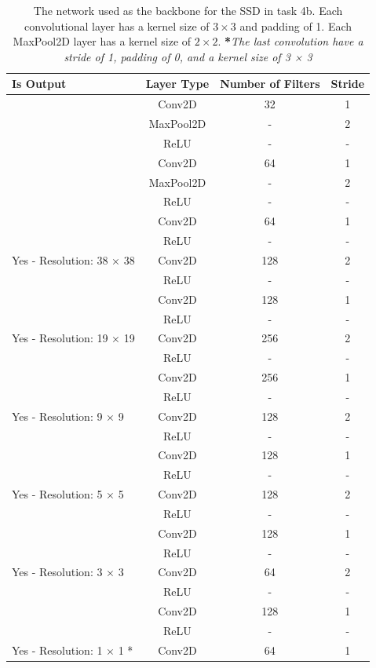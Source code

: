 \documentclass{article}
\begin{document}
\begin{table}[H]
\caption{The network used as the backbone for the SSD in task 4b. Each convolutional layer has a kernel size of $3 \times 3$ and padding of
1. Each MaxPool2D layer has a kernel size of $2 \times 2$. \textbf{*}\textit{The last
convolution have a stride of 1, padding of 0, and a kernel size of 3 × 3}
}
\label{tab:base_net}
\begin{tabular}{l|c|c|c}
\hline
Is Output & \multicolumn{1}{l|}{Layer Type} & \multicolumn{1}{l|}{Number of Filters} & \multicolumn{1}{l}{Stride} \\ \hline
 & Conv2D & 32 & 1 \\
 & MaxPool2D & - & 2 \\
 & ReLU & - & - \\
 & Conv2D & 64 & 1 \\
 & MaxPool2D & - & 2 \\
 & ReLU & - & - \\
 & Conv2D & 64 & 1 \\
 & ReLU & - & - \\
Yes - Resolution: 38 × 38 & Conv2D & 128 & 2 \\ \hline
 & ReLU & - & - \\
 & Conv2D & 128 & 1 \\
 & ReLU & - & - \\
Yes - Resolution: 19 × 19 & Conv2D & 256 & 2 \\ \hline
 & ReLU & - & - \\
 & Conv2D & 256 & 1 \\
 & ReLU & - & - \\
Yes - Resolution: 9 × 9 & Conv2D & 128 & 2 \\ \hline
 & ReLU & - & - \\
 & Conv2D & 128 & 1 \\
 & ReLU & - & - \\
Yes - Resolution: 5 × 5 & Conv2D & 128 & 2 \\ \hline
 & ReLU & - & - \\
 & Conv2D & 128 & 1 \\
 & ReLU & - & - \\
Yes - Resolution: 3 × 3 & Conv2D & 64 & 2 \\ \hline
 & ReLU & - & - \\
 & Conv2D & 128 & 1 \\
 & ReLU & - & - \\
Yes - Resolution: 1 × 1 * & Conv2D & 64 & 1 \\ \hline
\end{tabular}
\end{table}
\end{document}
